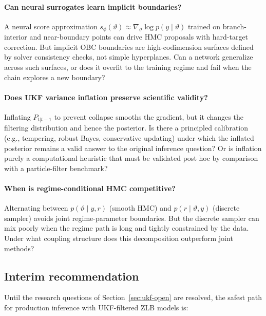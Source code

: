 \documentclass[11pt]{article}
\begin{document}
\paragraph{Can neural surrogates learn implicit boundaries?}
A neural score approximation $s_\phi(\vartheta)\approx\nabla_\vartheta\log
p(y\mid\vartheta)$ trained on branch-interior and near-boundary points can
drive HMC proposals with hard-target correction. But implicit OBC boundaries
are high-codimension surfaces defined by solver consistency checks, not simple
hyperplanes. Can a network generalize across such surfaces, or does it
overfit to the training regime and fail when the chain explores a new boundary?

\paragraph{Does UKF variance inflation preserve scientific validity?}
Inflating $P_{t|t-1}$ to prevent collapse smooths the gradient, but it changes
the filtering distribution and hence the posterior. Is there a principled
calibration (e.g., tempering, robust Bayes, conservative updating) under which
the inflated posterior remains a valid answer to the original inference
question? Or is inflation purely a computational heuristic that must be
validated post hoc by comparison with a particle-filter benchmark?

\paragraph{When is regime-conditional HMC competitive?}
Alternating between $p(\vartheta\mid y,r)$ (smooth HMC) and $p(r\mid\vartheta,y)$
(discrete sampler) avoids joint regime-parameter boundaries. But the discrete
sampler can mix poorly when the regime path is long and tightly constrained by
the data. Under what coupling structure does this decomposition outperform
joint methods?

\subsection{Interim recommendation}\label{sec:ukf-recommendation}

Until the research questions of Section~\ref{sec:ukf-open} are resolved, the
safest path for production inference with UKF-filtered ZLB models is:
\end{document}
